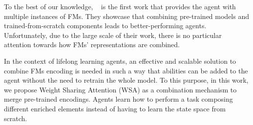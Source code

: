 To the best of our knowledge, ~\citet{sima2024} is the first work that provides the agent with multiple instances of FMs.
They showcase that combining pre-trained models and trained-from-scratch components leads to better-performing agents.
Unfortunately, due to the large scale of their work, there is no particular attention towards how FMs' representations are combined.

In the context of lifelong learning agents, an effective and scalable solution to combine FMs encoding is needed in such a way that abilities can be added to the agent without the need to retrain the whole model.
To this purpose, in this work, we propose Weight Sharing Attention (WSA) as a combination mechanism to merge pre-trained encodings.
Agents learn how to perform a task composing different enriched elements instead of having to learn the state space from scratch.